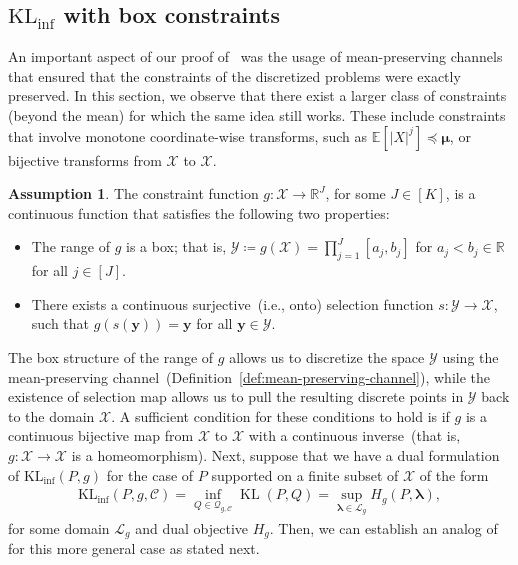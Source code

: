 \documentclass{article}
\theoremstyle{plain}
\theoremstyle{definition}
\newtheorem{assumption}[assumption]{Assumption}
\newcommand{\KLinf}{\operatorname{KL_{inf}}}
\newcommand{\KL}{\operatorname{KL}}
\newcommand{\calC}{\mathcal C}
\newcommand{\calQ}{\mathcal Q}
\newcommand{\calX}{\mathcal X}
\newcommand{\calL}{\mathcal L}
\newcommand{\calY}{\mathcal Y}
\newcommand{\yvec}{\mathbf{y}}
\newcommand{\boldlambda}{\boldsymbol{\lambda}}
\newcommand{\boldmu}{\boldsymbol{\mu}}
\begin{document}
\subsection{$\KLinf$ with box constraints}
\label{appendix:box-constraints}
An important aspect of our proof of~ was the usage of mean-preserving channels that ensured that the constraints of the discretized problems were exactly preserved. In this section, we observe that there exist a larger class of constraints (beyond the mean) for which the same idea still works. 
These include  constraints that involve monotone coordinate-wise transforms, such as $\mathbb{E}[|X|^j] \preccurlyeq \boldmu$, or bijective transforms from $\calX$ to $\calX$. 
\begin{assumption}
    \label{assump:general-constraint-1}
    The constraint function $g:\calX \to \mathbb{R}^J$, for some $J \in [K]$, is a continuous function that satisfies the following two properties: 
    \begin{itemize}
        \item The range of $g$ is a box; that is, $\calY \coloneqq g(\calX) =  \prod_{j=1}^J [a_j, b_j]$ for $a_j < b_j \in \mathbb{R}$ for all $j \in [J]$. 
        \item There exists a continuous surjective~(i.e., onto) selection function $s:\calY \to \calX$, such that $g(s(\yvec)) = \yvec$ for all $\yvec \in \calY$.  
\end{itemize}
\end{assumption}
The box structure of the range of $g$ allows us to discretize the space $\calY$ using the mean-preserving channel~(Definition~\ref{def:mean-preserving-channel}), while the existence of selection map allows us to pull the resulting discrete points in $\calY$ back to the domain $\calX$. 
A sufficient condition for these conditions to hold is if $g$ is a continuous bijective map from $\calX$ to $\calX$ with a continuous inverse~(that is, $g:\calX \to \calX$ is a homeomorphism). 
Next, suppose that we have a dual formulation of $\KLinf(P, g)$ for the case of $P$ supported on a finite subset of $\calX$ of the form 
\begin{align}
    \KLinf(P, g, \calC) = \inf_{Q \in \calQ_{g, \calC}} \KL(P, Q) = \sup_{\boldlambda \in \calL_g} H_g(P, \boldlambda),  \label{eq:finite-klinf-general-constraint}
\end{align}
for some domain $\calL_g$ and dual objective $H_g$. Then, we can establish an analog of~ for this more general case as stated next. 
\end{document}
